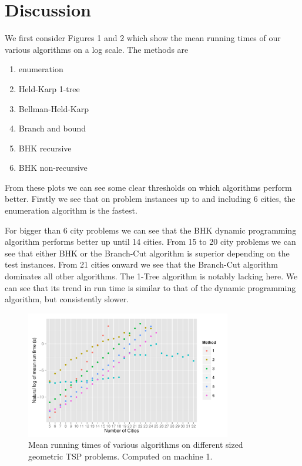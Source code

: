 \documentclass[11pt]{article}
\begin{document}
	\section{Discussion}
	\label{sec:discussion}
	We first consider Figures 1 and 2 which show the mean running times of our various algorithms on a log scale. The methods are 
	\begin{enumerate}
 \item enumeration
 \item Held-Karp 1-tree
 \item Bellman-Held-Karp
 \item Branch and bound
 \item BHK recursive
 \item BHK non-recursive
\end{enumerate}
From these plots we can see some clear thresholds on which algorithms perform better. Firstly we see that on problem instances up to and including 6 cities, the enumeration algorithm is the fastest.
	
	For bigger than 6 city problems we can see that the BHK dynamic programming algorithm performs better up until 14 cities. From 15 to 20 city problems we can see that either BHK or the Branch-Cut algorithm is superior depending on the test instances. From 21 cities onward we see that the Branch-Cut algorithm dominates all other algorithms. The 1-Tree algorithm is notably lacking here. We can see that its trend in run time is similar to that of the dynamic programming algorithm, but consistently slower.
	
	\begin{figure}[H]
		\center
		\includegraphics[width=0.8\textwidth]{s1-log}
		\caption{Mean running times of various algorithms on different sized geometric TSP problems. Computed on machine 1.}
		\label{fig:m1-runtime}
	\end{figure}
	
\end{document}
